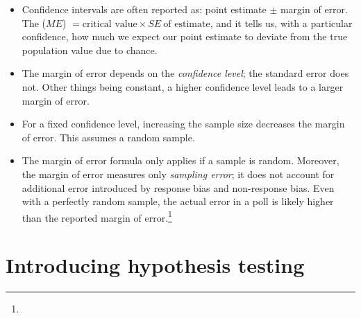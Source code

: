 \noindent {}
\begin{itemize}
\item Confidence intervals are often reported as: point estimate $\pm$ margin of error.  The  ($ME$) $=\text{critical value} \times SE\ \text{of estimate}$, and it tells us, with a particular confidence, how much we expect our point estimate to deviate from the true population value due to chance.  

\item The margin of error depends on the \emph{confidence level}; the standard error does not.  Other things being constant, a higher confidence level leads to a larger margin of error.  

\item For a fixed confidence level, increasing the sample size decreases the margin of error.  This assumes a random sample.

\item The margin of error formula only applies if a sample is random.  Moreover, the margin of error measures only \emph{sampling error}; it does not account for additional error introduced by response bias and non-response bias.  Even with a perfectly random sample, the actual error in a poll is likely higher than the reported margin of error.\footnote{}

\end{itemize}


{}

\section[Introducing hypothesis testing]{Introducing hypothesis testing }
\label{hypothesisTesting}

